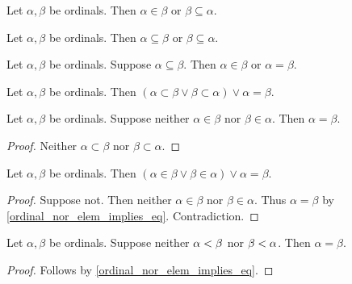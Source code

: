 \begin{proposition}\label{ordinal_elem_or_subseteq}
    Let $\alpha,\beta$ be ordinals.
    Then $\alpha\in\beta$ or $\beta\subseteq\alpha$.
\end{proposition}


\begin{proposition}\label{ordinal_subseteq_or_subseteq}
    Let $\alpha,\beta$ be ordinals.
    Then $\alpha\subseteq\beta$ or $\beta\subseteq\alpha$.
\end{proposition}


\begin{proposition}\label{ordinal_subseteq_implies_elem_or_eq}
    Let $\alpha,\beta$ be ordinals.
    Suppose $\alpha\subseteq\beta$.
    Then $\alpha\in\beta$ or $\alpha = \beta$.
\end{proposition}


\begin{corollary}\label{ordinal_subset_trichotomy}
    Let $\alpha,\beta$ be ordinals.
    Then $(\alpha\subset\beta \lor \beta\subset\alpha) \lor \alpha = \beta$.
\end{corollary}

\begin{proposition}\label{ordinal_nor_elem_implies_eq}
    Let $\alpha,\beta$ be ordinals.
    Suppose neither $\alpha\in\beta$ nor $\beta\in\alpha$.
    Then $\alpha = \beta$.
\end{proposition}
\begin{proof}
    Neither $\alpha\subset\beta$ nor $\beta\subset\alpha$.
\end{proof}

\begin{proposition}\label{ordinal_in_trichotomy}
    Let $\alpha,\beta$ be ordinals. Then $(\alpha\in\beta \lor \beta\in\alpha) \lor \alpha = \beta$.
\end{proposition}
\begin{proof}
    Suppose not.
    Then neither $\alpha\in\beta$ nor $\beta\in\alpha$.
    Thus $\alpha = \beta$ by \cref{ordinal_nor_elem_implies_eq}. Contradiction.
\end{proof}

\begin{corollary}\label{ordinal_prec_trichotomy}
    Let $\alpha,\beta$ be ordinals.
    Suppose neither $\alpha<\beta$ nor $\beta<\alpha$.
    Then $\alpha = \beta$.
\end{corollary}
\begin{proof}
    Follows by \cref{ordinal_nor_elem_implies_eq}.
\end{proof}

